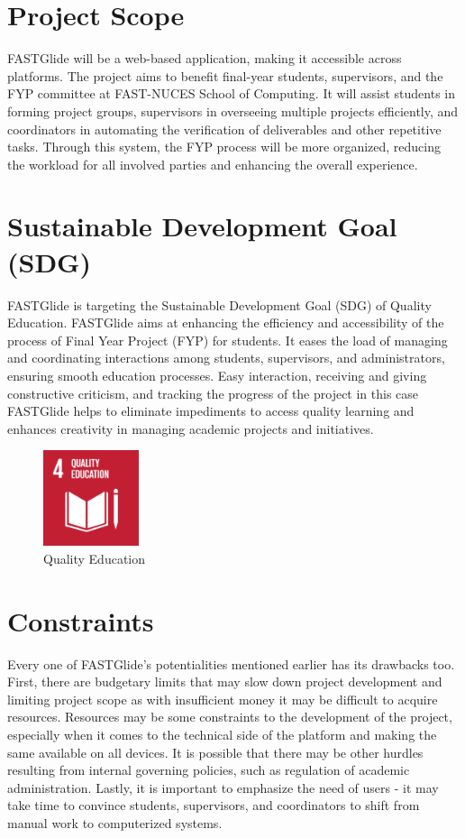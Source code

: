 \documentclass{FastFyp}
\begin{document}
\section{Project Scope}
FASTGlide will be a web-based application, making it accessible across platforms. The project aims to benefit final-year students, supervisors, and the FYP committee at FAST-NUCES School of Computing. It will assist students in forming project groups, supervisors in overseeing multiple projects efficiently, and coordinators in automating the verification of deliverables and other repetitive tasks. Through this system, the FYP process will be more organized, reducing the workload for all involved parties and enhancing the overall experience.
\section{Sustainable Development Goal (SDG)}
FASTGlide is targeting the Sustainable Development Goal (SDG) of Quality Education. FASTGlide aims at enhancing the efficiency and accessibility of the process of Final Year Project (FYP) for students. It eases the load of managing and coordinating interactions among students, supervisors, and administrators, ensuring smooth education processes. Easy interaction, receiving and giving constructive criticism, and tracking the progress of the project in this case FASTGlide helps to eliminate impediments to access quality learning and enhances creativity in managing academic projects and initiatives.
\begin{figure} [H]
    \centering
\includegraphics[width=0.25\textwidth, height=0.15\textheight]{Figures/Picture1}
    \caption{Quality Education}
    \label{fig:1}
\end{figure}
\section{Constraints}
Every one of FASTGlide’s potentialities mentioned earlier has its drawbacks too. First, there are budgetary limits that may slow down project development and limiting project scope as with insufficient money it may be difficult to acquire resources. Resources may be some constraints to the development of the project, especially when it comes to the technical side of the platform and making the same available on all devices. It is possible that there may be other hurdles resulting from internal governing policies, such as regulation of academic administration. Lastly, it is important to emphasize the need of users - it may take time to convince students, supervisors, and coordinators to shift from manual work to computerized systems.
\end{document}
